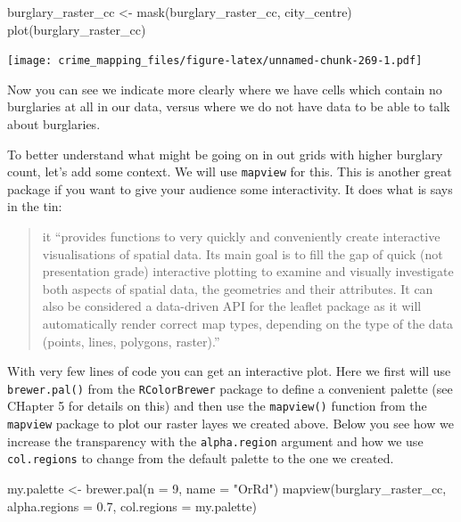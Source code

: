 \documentclass[
  krantz2]{krantz}
\makeatletter
\newenvironment{Shaded}{\begin{snugshade}}{\end{snugshade}}
\newcommand{\AttributeTok}[1]{\textcolor[rgb]{0.61,0.61,0.61}{#1}}
\newcommand{\DecValTok}[1]{\textcolor[rgb]{0.06,0.06,0.06}{#1}}
\newcommand{\FloatTok}[1]{\textcolor[rgb]{0.06,0.06,0.06}{#1}}
\newcommand{\FunctionTok}[1]{\textcolor[rgb]{0,0,0}{#1}}
\newcommand{\NormalTok}[1]{#1}
\newcommand{\OtherTok}[1]{\textcolor[rgb]{0.37,0.37,0.37}{#1}}
\newcommand{\StringTok}[1]{\textcolor[rgb]{0.5,0.5,0.5}{#1}}
\newenvironment{kframe}{%
\medskip{}
\setlength{\fboxsep}{.8em}
 \def\at@end@of@kframe{}%
 \ifinner\ifhmode%
  \def\at@end@of@kframe{\end{minipage}}%
  \begin{minipage}{\columnwidth}%
 \fi\fi%
 \def\FrameCommand##1{\hskip\@totalleftmargin \hskip-\fboxsep
 \colorbox{shadecolor}{##1}\hskip-\fboxsep
     \hskip-\linewidth \hskip-\@totalleftmargin \hskip\columnwidth}%
 \MakeFramed {\advance\hsize-\width
   \@totalleftmargin\z@ \linewidth\hsize
   \@setminipage}}%
 {\par\unskip\endMakeFramed%
 \at@end@of@kframe}
\renewenvironment{Shaded}{\begin{kframe}}{\end{kframe}}
\makeatother
\begin{document}
\begin{Shaded}
\begin{Highlighting}[]
\NormalTok{burglary\_raster\_cc }\OtherTok{\textless{}{-}} \FunctionTok{mask}\NormalTok{(burglary\_raster\_cc, city\_centre)}
\FunctionTok{plot}\NormalTok{(burglary\_raster\_cc)}
\end{Highlighting}
\end{Shaded}

\texttt{[image: crime\_mapping\_files/figure-latex/unnamed-chunk-269-1.pdf]}

Now you can see we indicate more clearly where we have cells which contain no burglaries at all in our data, versus where we do not have data to be able to talk about burglaries.

To better understand what might be going on in out grids with higher burglary count, let's add some context. We will use \texttt{mapview} for this. This is another great package if you want to give your audience some interactivity. It does what is says in the tin:

\begin{quote}
it ``provides functions to very quickly and conveniently create interactive visualisations of spatial data. Its main goal is to fill the gap of quick (not presentation grade) interactive plotting to examine and visually investigate both aspects of spatial data, the geometries and their attributes. It can also be considered a data-driven API for the leaflet package as it will automatically render correct map types, depending on the type of the data (points, lines, polygons, raster).''
\end{quote}

With very few lines of code you can get an interactive plot. Here we first will use \texttt{brewer.pal()} from the \texttt{RColorBrewer} package to define a convenient palette (see CHapter 5 for details on this) and then use the \texttt{mapview()} function from the \texttt{mapview} package to plot our raster layes we created above. Below you see how we increase the transparency with the \texttt{alpha.region} argument and how we use \texttt{col.regions} to change from the default palette to the one we created.

\begin{Shaded}
\begin{Highlighting}[]
\NormalTok{my.palette }\OtherTok{\textless{}{-}} \FunctionTok{brewer.pal}\NormalTok{(}\AttributeTok{n =} \DecValTok{9}\NormalTok{, }\AttributeTok{name =} \StringTok{"OrRd"}\NormalTok{)}
\FunctionTok{mapview}\NormalTok{(burglary\_raster\_cc, }
        \AttributeTok{alpha.regions =} \FloatTok{0.7}\NormalTok{,}
        \AttributeTok{col.regions =}\NormalTok{ my.palette)}
\end{Highlighting}
\end{Shaded}
\end{document}
